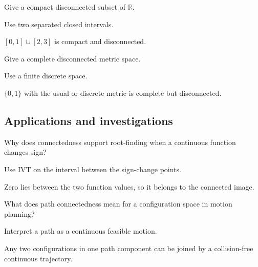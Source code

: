 \begin{exercise}\label{exr:ii07-expand-11}
Give a compact disconnected subset of \(\mathbb R\).
\end{exercise}
\begin{hint}
Use two separated closed intervals.
\end{hint}
\begin{solution}
\([0,1]\cup[2,3]\) is compact and disconnected.
\end{solution}

\begin{exercise}\label{exr:ii07-expand-12}
Give a complete disconnected metric space.
\end{exercise}
\begin{hint}
Use a finite discrete space.
\end{hint}
\begin{solution}
\(\{0,1\}\) with the usual or discrete metric is complete but disconnected.
\end{solution}

\subsection*{Applications and investigations}

\begin{exercise}\label{exr:ii07-expand-13}
Why does connectedness support root-finding when a continuous function changes sign?
\end{exercise}
\begin{hint}
Use IVT on the interval between the sign-change points.
\end{hint}
\begin{solution}
Zero lies between the two function values, so it belongs to the connected image.
\end{solution}

\begin{exercise}\label{exr:ii07-expand-14}
What does path connectedness mean for a configuration space in motion planning?
\end{exercise}
\begin{hint}
Interpret a path as a continuous feasible motion.
\end{hint}
\begin{solution}
Any two configurations in one path component can be joined by a collision-free continuous trajectory.
\end{solution}

